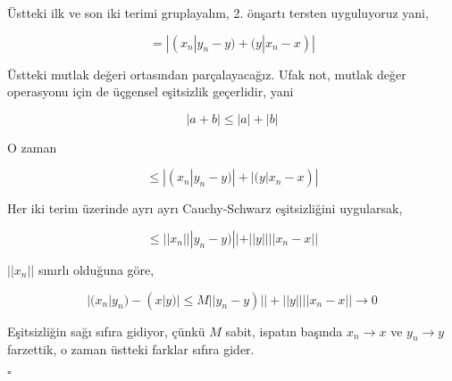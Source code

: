 \documentclass[12pt,fleqn]{article}\usepackage{../../common}
\begin{document}
Üstteki ilk ve son iki terimi gruplayalım, 2. önşartı tersten uyguluyoruz
yani, 

$$ = |(x_n|y_n-y) + (y|x_n-x)| $$

Üstteki mutlak değeri ortasından parçalayacağız. Ufak not, mutlak değer
operasyonu için de üçgensel eşitsizlik geçerlidir, yani 

$$ |a+b| \le |a| + |b| $$

O zaman 

$$ \le |(x_n|y_n-y)| + |(y|x_n-x)| $$

Her iki terim üzerinde ayrı ayrı Cauchy-Schwarz eşitsizliğini uygularsak, 

$$ \le ||x_n|||y_n-y)|| + ||y||||x_n-x|| $$

$||x_n||$ sınırlı olduğuna göre, 

$$ |(x_n|y_n) - (x|y)| \le M||y_n-y)|| + ||y||||x_n-x|| \to 0 $$

Eşitsizliğin sağı sıfıra gidiyor, çünkü $M$ sabit, ispatın başında $x_n \to x$
ve $y_n \to y$ farzettik, o zaman üstteki farklar sıfıra gider.

$\square$
\end{document}
